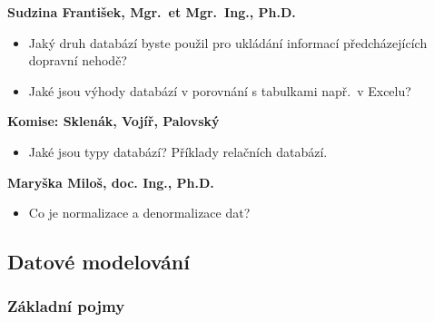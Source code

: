 \documentclass[12pt,a4paper]{article}
\begin{document}
\begin{profesorbox}
\textbf{Sudzina František, Mgr.\ et Mgr.\ Ing., Ph.D.}
\begin{itemize}
  \item Jaký druh databází byste použil pro ukládání informací předcházejících dopravní nehodě?
  \item Jaké jsou výhody databází v porovnání s tabulkami např.\ v Excelu?
\end{itemize}

\textbf{Komise: Sklenák, Vojíř, Palovský}
\begin{itemize}
  \item Jaké jsou typy databází? Příklady relačních databází.
\end{itemize}

\textbf{Maryška Miloš, doc. Ing., Ph.D.}
\begin{itemize}
  \item Co je normalizace a denormalizace dat?
\end{itemize}
\end{profesorbox}

\subsection{Datové modelování}

\subsubsection{Základní pojmy}
\end{document}
